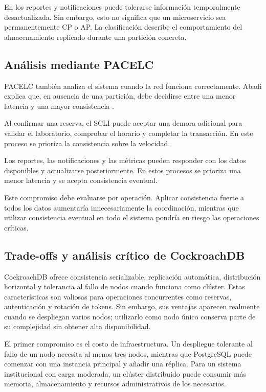 \documentclass[conference]{IEEEtran}
\begin{document}
En los reportes y notificaciones puede tolerarse información temporalmente desactualizada. Sin embargo, esto no significa que un microservicio sea permanentemente CP o AP. La clasificación describe el comportamiento del almacenamiento replicado durante una partición concreta.

\subsection{Análisis mediante PACELC}
PACELC también analiza el sistema cuando la red funciona correctamente. Abadi explica que, en ausencia de una partición, debe decidirse entre una menor latencia y una mayor consistencia \cite{ref10}.

Al confirmar una reserva, el SCLI puede aceptar una demora adicional para validar el laboratorio, comprobar el horario y completar la transacción. En este proceso se prioriza la consistencia sobre la velocidad.

Los reportes, las notificaciones y las métricas pueden responder con los datos disponibles y actualizarse posteriormente. En estos procesos se prioriza una menor latencia y se acepta consistencia eventual.

Este compromiso debe evaluarse por operación. Aplicar consistencia fuerte a todos los datos aumentaría innecesariamente la coordinación, mientras que utilizar consistencia eventual en todo el sistema pondría en riesgo las operaciones críticas.

\subsection{Trade-offs y análisis crítico de CockroachDB}
CockroachDB ofrece consistencia serializable, replicación automática, distribución horizontal y tolerancia al fallo de nodos cuando funciona como clúster. Estas características son valiosas para operaciones concurrentes como reservas, autenticación y rotación de tokens. Sin embargo, sus ventajas aparecen realmente cuando se despliegan varios nodos; utilizarlo como nodo único conserva parte de su complejidad sin obtener alta disponibilidad.

El primer compromiso es el costo de infraestructura. Un despliegue tolerante al fallo de un nodo necesita al menos tres nodos, mientras que PostgreSQL puede comenzar con una instancia principal y añadir una réplica. Para un sistema institucional con carga moderada, un clúster distribuido puede consumir más memoria, almacenamiento y recursos administrativos de los necesarios.
\end{document}
